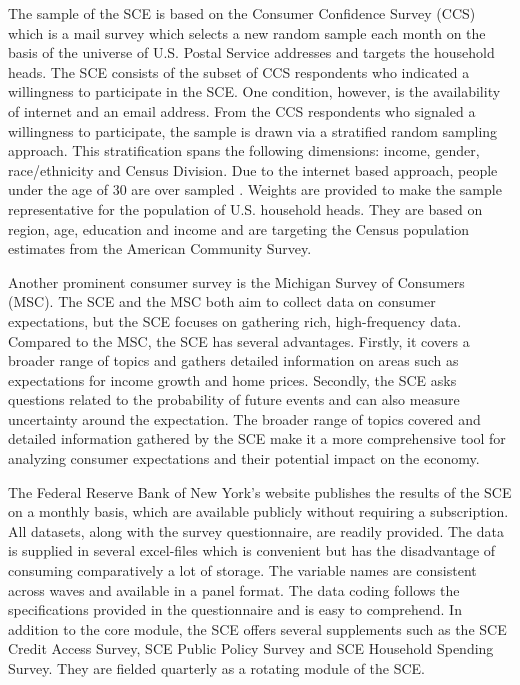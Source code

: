 \documentclass[11pt,a4paper,leqno]{article}
\begin{document}
The sample of the SCE is based on the Consumer Confidence Survey (CCS) which is a mail survey which selects a new random sample each month on the basis of the universe of U.S. Postal Service addresses and targets the household heads. The SCE consists of the subset of CCS respondents who indicated a willingness to participate in the SCE. One condition, however, is the availability of internet and an email address. From the CCS respondents who signaled a willingness to participate, the sample is drawn via a stratified random sampling approach. This stratification spans the following dimensions: income, gender, race/ethnicity and Census Division. Due to the internet based approach, people under the age of 30 are over sampled \parencite{SCEOverview}. Weights are provided to make the sample representative for the population of U.S. household heads. They are based on region, age, education and income and are targeting the Census population estimates from the American Community Survey. 

Another prominent consumer survey is the Michigan Survey of Consumers (MSC).
The SCE and the MSC both aim to collect data on consumer expectations, but the SCE focuses on gathering rich, high-frequency data. Compared to the MSC, the SCE has several advantages. Firstly, it covers a broader range of topics and gathers detailed information on areas such as expectations for income growth and home prices. Secondly, the SCE asks questions related to the probability of future events and can also measure uncertainty around the expectation. The broader range of topics covered and detailed information gathered by the SCE make it a more comprehensive tool for analyzing consumer expectations and their potential impact on the economy.

The Federal Reserve Bank of New York's website publishes the results of the SCE on a monthly basis, which are available publicly without requiring a subscription.  All datasets, along with the survey questionnaire, are readily provided. The data is supplied in several excel-files which is convenient but has the disadvantage of consuming comparatively a lot of storage. The variable names are consistent across waves and available in a panel format. The data coding follows the specifications provided in the questionnaire and is easy to comprehend. In addition to the core module, the SCE offers several supplements such as the SCE Credit Access Survey, SCE Public Policy Survey and SCE Household Spending Survey. They are fielded quarterly as a rotating module of the SCE. 
\end{document}

